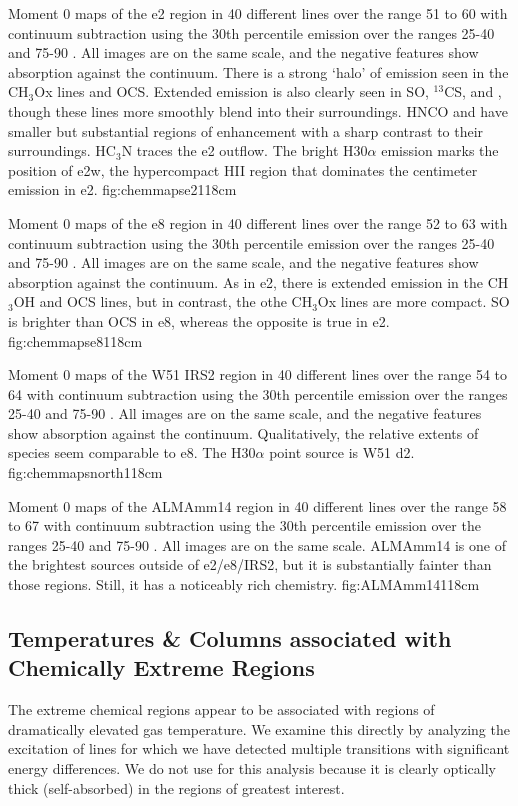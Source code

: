 \documentclass{aa}
\begin{document}
{Moment 0 maps of the e2 region in 40 different lines over the range 51 to 60
\kms with continuum subtraction using the 30th percentile emission
over the ranges 25-40 and 75-90 \kms.  All images are on the same scale, and
the negative features show absorption against the continuum.  There
is a strong `halo' of emission seen in the CH$_3$Ox lines and OCS.  Extended
emission is also clearly seen in SO, $^{13}$CS, and \formaldehyde, though these
lines more smoothly blend into their surroundings.  HNCO and \formamide have
smaller but substantial regions of enhancement with a sharp contrast to their
surroundings.  HC$_3$N traces the e2 outflow.  The bright H30$\alpha$ emission
marks the position of e2w, the hypercompact HII region that dominates the
centimeter emission in e2.
}{fig:chemmapse2}{1}{18cm}

{Moment 0 maps of the e8 region in 40 different lines over the range 52 to 63
\kms with continuum subtraction using the 30th percentile emission
over the ranges 25-40 and 75-90 \kms.  All images are on the same scale, and
the negative features show absorption against the continuum.  As in e2,
there is extended emission in the CH$_3$OH and OCS lines, but in contrast,
the othe CH$_3$Ox lines are more compact. SO is brighter than OCS in e8, 
whereas the opposite is true in e2.
}{fig:chemmapse8}{1}{18cm}

{Moment 0 maps of the W51 IRS2 region in 40 different lines over the range 54 to 64
\kms with continuum subtraction using the 30th percentile emission
over the ranges 25-40 and 75-90 \kms.  All images are on the same scale, and
the negative features show absorption against the continuum.  Qualitatively,
 the relative extents of species seem comparable to e8.  The H30$\alpha$ 
 point source is W51 d2.
}{fig:chemmapsnorth}{1}{18cm}

{Moment 0 maps of the ALMAmm14 region in 40 different lines over the range 58 to 67
\kms with continuum subtraction using the 30th percentile emission
over the ranges 25-40 and 75-90 \kms.  All images are on the same scale. 
ALMAmm14 is one of the brightest sources outside of e2/e8/IRS2, but
it is substantially fainter than those regions.  Still, it has a noticeably
rich chemistry.
}{fig:ALMAmm14}{1}{18cm}

\subsection{Temperatures \& Columns associated with Chemically Extreme Regions}
The extreme chemical regions appear to be associated with regions of
dramatically elevated gas temperature.  We examine this directly by analyzing
the excitation of lines for which we have detected multiple transitions with
significant energy differences.  We do not use \formaldehyde for this analysis
because it is clearly optically thick (self-absorbed) in the regions of
greatest interest.
\end{document}
